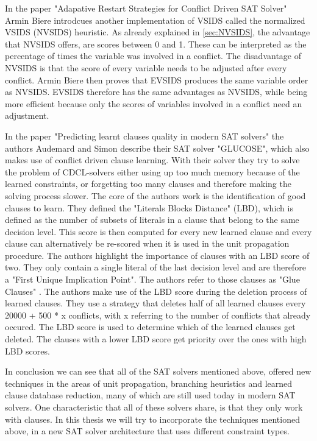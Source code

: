 In the paper "Adapative Restart Strategies for Conflict Driven SAT Solver" \cite{biere2008adaptive} Armin Biere introdcues another implementation of VSIDS called the normalized VSIDS (NVSIDS) heuristic. As already explained in \ref{sec:NVSIDS}, the advantage that NVSIDS offers, are scores between 0 and 1. These can be interpreted as the percentage of times the variable was involved in a conflict. The disadvantage of NVSIDS is that the score of every variable needs to be adjusted after every conflict. Armin Biere then proves that EVSIDS produces the same variable order as NVSIDS. EVSIDS therefore has the same advantages as NVSIDS, while being more efficient because only the scores of variables involved in a conflict need an adjustment.

In the paper "Predicting learnt clauses quality in modern SAT solvers" \cite{audemard2009predicting} the authors Audemard and Simon describe their SAT solver "GLUCOSE", which also makes use of conflict driven clause learning. With their solver they try to solve the problem of CDCL-solvers either using up too much memory because of the learned constraints, or forgetting too many clauses and therefore making the solving process slower. The core of the authors work is the identification of good clauses to learn. They defined the "Literals Blocks Distance" (LBD), which is defined as the number of subsets of literals in a clause that belong to the same decision level. This score is then computed for every new learned clause and every clause can alternatively be re-scored when it is used in the unit propagation procedure. The authors highlight the importance of clauses with an LBD score of two. They only contain a single literal of the last decision level and are therefore a "First Unique Implication Point". The authors refer to those clauses as "Glue Clauses" \cite{audemard2009predicting}. The authors make use of the LBD score during the deletion process of learned clauses. They use a strategy that deletes half of all learned clauses every 20000 + 500 * x conflicts, with x referring to the number of conflicts that already occured. The LBD score is used to determine which of the learned clauses get deleted. The clauses with a lower LBD score get priority over the ones with high LBD scores.

In conclusion we can see that all of the SAT solvers mentioned above, offered new techniques in the areas of unit propagation, branching heuristics and learned clause database reduction, many of which are still used today in modern SAT solvers. One characteristic that all of these solvers share, is that they only work with clauses. In this thesis we will try to incorporate the techniques mentioned above, in a new SAT solver architecture that uses different constraint types.

